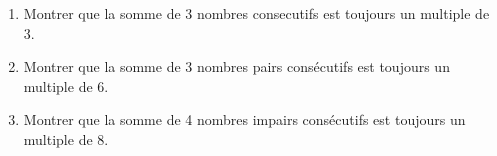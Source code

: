 \begin{exercise}\hfill 
	\begin{enumerate}[label={\arabic*)}, leftmargin=*]   
		\item Montrer que la somme de 3 nombres consecutifs est toujours un multiple de 3.
		\item Montrer que la somme de 3 nombres pairs consécutifs est toujours un multiple de 6.
		\item Montrer que la somme de 4 nombres impairs consécutifs est toujours un multiple de 8.
	\end{enumerate} 
\end{exercise}
%	
